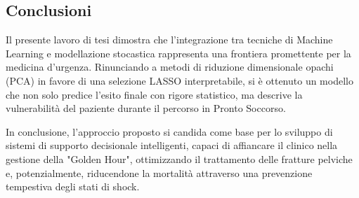 \documentclass[11pt, oneside, noexaminfo]{sapthesis}   	%
\begin{document}
\subsection{Conclusioni}
Il presente lavoro di tesi dimostra che l'integrazione tra tecniche di Machine Learning e modellazione stocastica rappresenta una frontiera promettente per la medicina d'urgenza. Rinunciando a metodi di riduzione dimensionale opachi (PCA) in favore di una selezione LASSO interpretabile, si è ottenuto un modello che non solo predice l'esito finale con rigore statistico, ma descrive la vulnerabilità del paziente durante il percorso in Pronto Soccorso.

In conclusione, l'approccio proposto si candida come base per lo sviluppo di sistemi di supporto decisionale intelligenti, capaci di affiancare il clinico nella gestione della "Golden Hour", ottimizzando il trattamento delle fratture pelviche e, potenzialmente, riducendone la mortalità attraverso una prevenzione tempestiva degli stati di shock.
\end{document}
